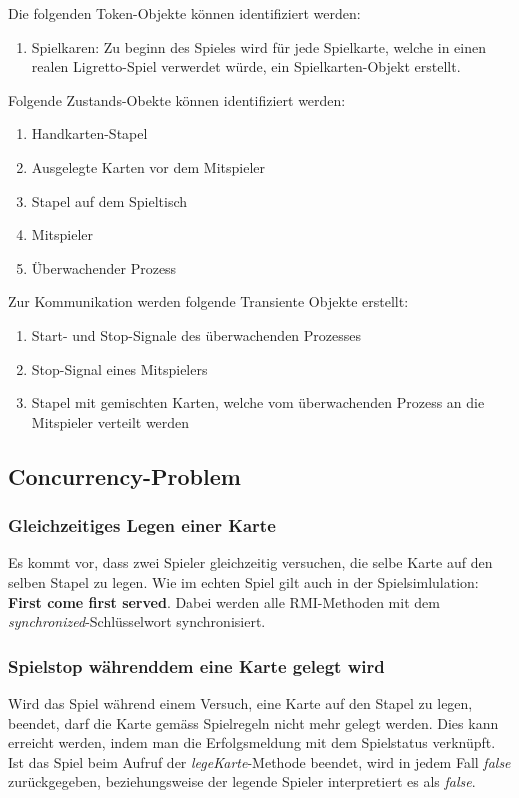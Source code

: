 Die folgenden Token-Objekte können identifiziert werden:
\begin{enumerate}
	\item Spielkaren: Zu beginn des Spieles wird für jede Spielkarte, welche in einen realen Ligretto-Spiel verwerdet würde, ein Spielkarten-Objekt erstellt.
\end{enumerate}

Folgende Zustands-Obekte können identifiziert werden:
\begin{enumerate}
	\item Handkarten-Stapel
	\item Ausgelegte Karten vor dem Mitspieler
	\item Stapel auf dem Spieltisch
	\item Mitspieler
	\item Überwachender Prozess
\end{enumerate}

Zur Kommunikation werden folgende Transiente Objekte erstellt:
\begin{enumerate}
	\item Start- und Stop-Signale des überwachenden Prozesses
	\item Stop-Signal eines Mitspielers
	\item Stapel mit gemischten Karten, welche vom überwachenden Prozess an die Mitspieler verteilt werden
\end{enumerate}


\subsection{Concurrency-Problem}

\subsubsection{Gleichzeitiges Legen einer Karte}
Es kommt vor, dass zwei Spieler gleichzeitig versuchen, die selbe Karte auf den selben Stapel zu legen. Wie im echten Spiel gilt auch in der Spielsimlulation: \textbf{First come first served}. Dabei werden alle RMI-Methoden mit dem \textit{synchronized}-Schlüsselwort synchronisiert.

\subsubsection{Spielstop währenddem eine Karte gelegt wird}
Wird das Spiel während einem Versuch, eine Karte auf den Stapel zu legen, beendet, darf die Karte gemäss Spielregeln nicht mehr gelegt werden. Dies kann erreicht werden, indem man die Erfolgsmeldung mit dem Spielstatus verknüpft. Ist das Spiel beim Aufruf der \textit{legeKarte}-Methode beendet, wird in jedem Fall \textit{false} zurückgegeben, beziehungsweise der legende Spieler interpretiert es als \textit{false}.


